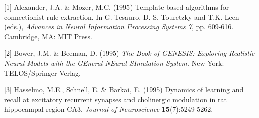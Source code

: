 \documentclass{article} %
\theoremstyle{definition}
\begin{document}
\pagebreak

\small{
[1] Alexander, J.A. \& Mozer, M.C. (1995) Template-based algorithms
for connectionist rule extraction. In G. Tesauro, D. S. Touretzky
and T.K. Leen (eds.), {\it Advances in Neural Information Processing
Systems 7}, pp. 609-616. Cambridge, MA: MIT Press.

[2] Bower, J.M. \& Beeman, D. (1995) {\it The Book of GENESIS: Exploring
Realistic Neural Models with the GEneral NEural SImulation System.}
New York: TELOS/Springer-Verlag.

[3] Hasselmo, M.E., Schnell, E. \& Barkai, E. (1995) Dynamics of learning
and recall at excitatory recurrent synapses and cholinergic modulation
in rat hippocampal region CA3. {\it Journal of Neuroscience}
{\bf 15}(7):5249-5262.
}
\end{document}
